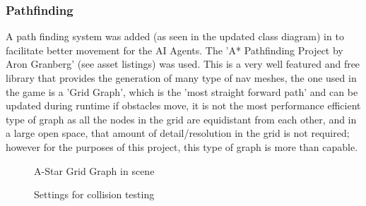 \documentclass[11pt]{report}
\begin{document}
\subsubsection{Pathfinding}
A path finding system was added (as seen in the updated class diagram) in to facilitate better movement for the AI Agents. The 'A* Pathfinding Project by Aron Granberg' (see asset listings) was used. This is a very well featured and free library that provides the generation of many type of nav meshes, the one used in the game is a 'Grid Graph', which is the 'most straight forward path' and can be updated during runtime if obstacles move, it is not the most performance efficient type of graph as all the nodes in the grid are equidistant from each other, and in a large open space, that amount of detail/resolution in the grid is not required; however for the purposes of this project, this type of graph is more than capable\cite{astarPathfinding}.

\begin{figure}[H]
    \begin{minipage}{.5\textwidth}
        \centering
        \caption{A-Star Grid Graph in scene}
    \end{minipage}
    \begin{minipage}{.5\textwidth}
        \centering
        \caption{Settings for collision testing}
    \end{minipage}
\end{figure}
\end{document}
